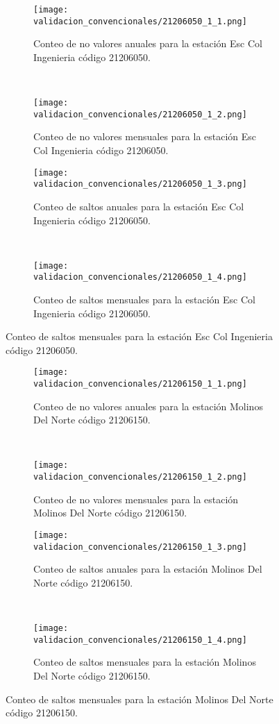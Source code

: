 \begin{figure}[H]\ContinuedFloat
\centering
	\begin{subfigure}[normla]{0.4\textwidth}
	\texttt{[image: validacion\_convencionales/21206050\_1\_1.png]}
		\caption{Conteo de no valores anuales para la estación Esc Col Ingenieria código 21206050.}
		\label{subfig:a1}
		\end{subfigure}
		~
    \begin{subfigure}[normla]{0.4\textwidth}
	\texttt{[image: validacion\_convencionales/21206050\_1\_2.png]}
		\caption{Conteo de no valores mensuales para la estación Esc Col Ingenieria código 21206050.}
		\label{subfig:a2}
		\end{subfigure}
		
    \begin{subfigure}[normla]{0.4\textwidth}
	\texttt{[image: validacion\_convencionales/21206050\_1\_3.png]}
		\caption{Conteo de saltos anuales para la estación Esc Col Ingenieria código 21206050.}
		\label{subfig:a1}
		\end{subfigure}
		~
    \begin{subfigure}[normla]{0.4\textwidth}
	\texttt{[image: validacion\_convencionales/21206050\_1\_4.png]}
		\caption{Conteo de saltos mensuales para la estación Esc Col Ingenieria código 21206050.}
		\label{subfig:a2}
		\end{subfigure}

	
\end{figure}
           
\begin{figure}[H]\ContinuedFloat
\centering
	\begin{subfigure}[normla]{0.4\textwidth}
	\texttt{[image: validacion\_convencionales/21206150\_1\_1.png]}
		\caption{Conteo de no valores anuales para la estación Molinos Del Norte código 21206150.}
		\label{subfig:a1}
		\end{subfigure}
		~
    \begin{subfigure}[normla]{0.4\textwidth}
	\texttt{[image: validacion\_convencionales/21206150\_1\_2.png]}
		\caption{Conteo de no valores mensuales para la estación Molinos Del Norte código 21206150.}
		\label{subfig:a2}
		\end{subfigure}
		
    \begin{subfigure}[normla]{0.4\textwidth}
	\texttt{[image: validacion\_convencionales/21206150\_1\_3.png]}
		\caption{Conteo de saltos anuales para la estación Molinos Del Norte código 21206150.}
		\label{subfig:a1}
		\end{subfigure}
		~
    \begin{subfigure}[normla]{0.4\textwidth}
	\texttt{[image: validacion\_convencionales/21206150\_1\_4.png]}
		\caption{Conteo de saltos mensuales para la estación Molinos Del Norte código 21206150.}
		\label{subfig:a2}
		\end{subfigure}

	
\end{figure}
           
